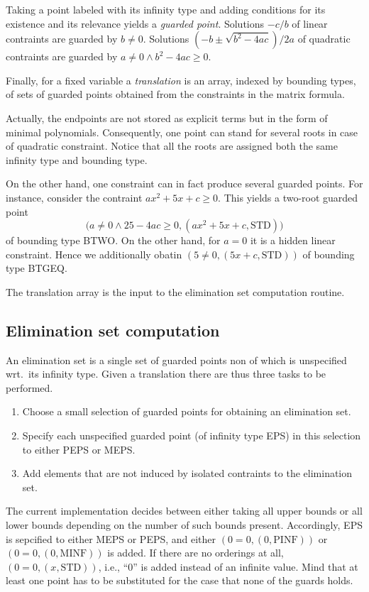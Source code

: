 Taking a point labeled with its infinity type and adding conditions
for its existence and its relevance yields a {\em guarded point}. 
Solutions $-c/b$ of linear contraints are guarded by $b\neq 0$. 
Solutions $(-b\pm\sqrt{b^2-4ac})/2a$ of quadratic contraints are
guarded by $a\neq0\land b^2-4ac\geq0$.

Finally, for a fixed variable a {\em translation} is an array, indexed
by bounding types, of sets of guarded points obtained from the
constraints in the matrix formula.

Actually, the endpoints are not stored as explicit terms but in the
form of minimal polynomials. Consequently, one point can stand for
several roots in case of quadratic constraint. Notice that all the
roots are assigned both the same infinity type and bounding type.

On the other hand, one constraint can in fact produce several guarded
points. For instance, consider the contraint $ax^2+5x+c\geq0$. This
yields a two-root guarded point
$$
\bigl(a\neq0\land 25-4ac\geq0,(ax^2+5x+c,\mbox{STD})\bigr)
$$
of bounding type BTWO. On the other hand, for $a=0$ it is a hidden
linear constraint. Hence we additionally obatin
$(5\neq0,(5x+c,\mbox{STD}))$ of bounding type BTGEQ.

The translation array is the input to the elimination set computation
routine.
%
\subsection{Elimination set computation}
An elimination set is a single set of guarded points non of which is
unspecified wrt.~its infinity type. Given a translation there are thus
three tasks to be performed.
\begin{enumerate}
\item Choose a small selection of guarded points for obtaining an
elimination set.
\item Specify each unspecified guarded point (of infinity type EPS) in
this selection to either PEPS or MEPS.
\item Add elements that are not induced by isolated contraints to the
elimination set.
\end{enumerate}
%
The current implementation decides between either taking all upper
bounds or all lower bounds depending on the number of such bounds
present. Accordingly, EPS is sepcified to either MEPS or PEPS, and
either $(0=0,(0,\mbox{PINF}))$ or $(0=0,(0,\mbox{MINF}))$ is added. If
there are no orderings at all, $(0=0,(x,\mbox{STD}))$, i.e., ``$0$''
is added instead of an infinite value. Mind that at least one point
has to be substituted for the case that none of the guards holds.

